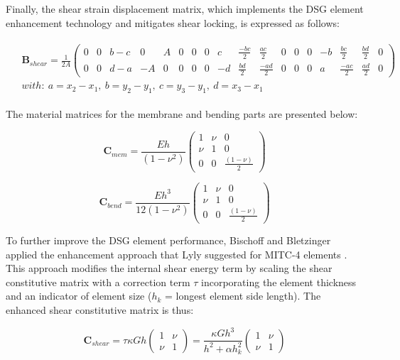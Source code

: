 Finally, the shear strain displacement matrix, which implements the DSG element enhancement technology and mitigates shear locking, is expressed as follows:

\begin{gather} 
	\begin{aligned}
		& \mathbf{B}_{shear} =  \frac{1}{2 A}
		\begin{pmatrix}
			0 & 0 & b-c & 0 & A & 0 & 0 & 0 & c & \frac{-bc}{2} & \frac{ac}{2} & 0 & 0 & 0 & -b & \frac{bc}{2} & \frac{bd}{2} & 0 \\
			0 & 0 & d-a & -A & 0 & 0 & 0 & 0 & -d & \frac{bd}{2} & \frac{-ad}{2} & 0 & 0 & 0 & a & \frac{-ac}{2} & \frac{ad}{2} & 0
		\end{pmatrix}
		\\
		& with:\ 
		a = x_2-x_1,\ 
		b = y_2-y_1,\ 
		c = y_3-y_1,\ 
		d = x_3 - x_1
		\label{eqt10}
	\end{aligned}
\end{gather}

The material matrices for the membrane and bending parts are presented below:

\begin{equation} 
\mathbf{C}_{mem} =  \frac{Eh}{(1-\nu^2)}
\begin{pmatrix}
1 & \nu & 0 \\
\nu & 1 & 0 \\
0 & 0 & \frac{(1-\nu)}{2}
\end{pmatrix}
\label{eqt11}
\end{equation}

\begin{equation} 
\mathbf{C}_{bend} =  \frac{E h^3}{12(1-\nu^2)}
\begin{pmatrix}
1 & \nu & 0 \\
\nu & 1 & 0 \\
0 & 0 & \frac{(1-\nu)}{2}
\end{pmatrix}
\label{eqt12}
\end{equation}

To further improve the DSG element performance, Bischoff and Bletzinger \cite{Bis04} \cite{Bis01} applied the enhancement approach that Lyly suggested for MITC-4 elements \cite{Lyl93}. This approach modifies the internal shear energy term by scaling the shear constitutive matrix with a correction term $\tau$ incorporating the element thickness and an indicator of element size ($h_k$ = longest element side length). The enhanced  shear constitutive matrix is thus:

\begin{equation} 
\mathbf{C}_{shear} =  \tau \kappa Gh
\begin{pmatrix}
1 & \nu \\
\nu & 1 
\end{pmatrix}
=
\frac{\kappa G h^3}{h^2 + \alpha h_k^2}
\begin{pmatrix}
1 & \nu \\
\nu & 1 
\end{pmatrix}
\label{eqt14}
\end{equation}


